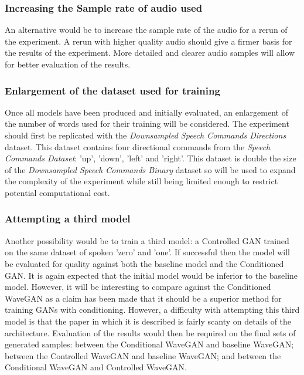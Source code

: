\documentclass[a4paper, titlepage]{article}
\begin{document}
\subsubsection{Increasing the Sample rate of audio used}

An alternative would be to increase the sample rate of the audio for a rerun of the experiment.
A rerun with higher quality audio should give a firmer basis for the results of the experiment.
More detailed and clearer audio samples will allow for better evaluation of the results.

\subsubsection{Enlargement of the dataset used for training}

Once all models have been produced and initially evaluated, an enlargement of the number of words used for their training will be considered.
The experiment should first be replicated with the \textit{Downsampled Speech Commands Directions} dataset.
This dataset contains four directional commands from the \textit{Speech Commands Dataset}: 'up', 'down', 'left' and 'right'.
This dataset is double the size of the \textit{Downsampled Speech Commands Binary} dataset so will be used to expand the complexity of the experiment while still being limited enough to restrict potential computational cost.

\subsubsection{Attempting a third model}

Another possibility would be to train a third model: a Controlled GAN trained on the same dataset of spoken 'zero' and 'one'.
If successful then the model will be evaluated for quality against both the baseline model and the Conditioned GAN.
It is again expected that the initial model would be inferior to the baseline model.
However, it will be interesting to compare against the Conditioned WaveGAN as a claim has been made that it should be a superior method for training GANs with conditioning.
However, a difficulty with attempting this third model is that the paper in which it is described is fairly scanty on details of the architecture.
\newline
\newline
Evaluation of the results would then be required on the final sets of generated samples: between the Conditional WaveGAN and baseline WaveGAN; between the Controlled WaveGAN and baseline WaveGAN; and between the Conditional WaveGAN and Controlled WaveGAN.
\end{document}
